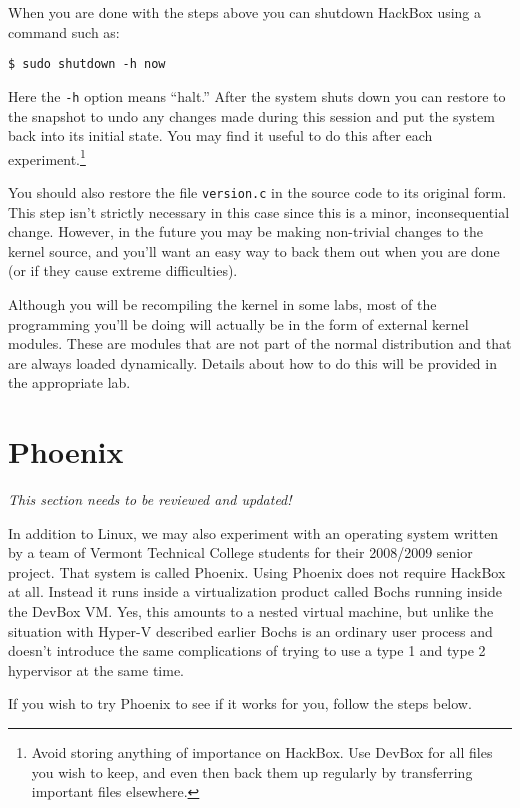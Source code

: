 \documentclass[twocolumn]{article}
\newcommand{\filename}[1]{\texttt{#1}}
\begin{document}
When you are done with the steps above you can shutdown HackBox using a command such as:
\begin{Verbatim}
$ sudo shutdown -h now
\end{Verbatim}
Here the \texttt{-h} option means ``halt.'' After the system shuts down you can restore to the
snapshot to undo any changes made during this session and put the system back into its initial
state. You may find it useful to do this after each experiment.\footnote{Avoid storing anything
  of importance on HackBox. Use DevBox for all files you wish to keep, and even then back them
  up regularly by transferring important files elsewhere.}

You should also restore the file \filename{version.c} in the source code to its original form.
This step isn't strictly necessary in this case since this is a minor, inconsequential change.
However, in the future you may be making non-trivial changes to the kernel source, and you'll
want an easy way to back them out when you are done (or if they cause extreme difficulties).

Although you will be recompiling the kernel in some labs, most of the programming you'll be
doing will actually be in the form of external kernel modules. These are modules that are not
part of the normal distribution and that are always loaded dynamically. Details about how to do
this will be provided in the appropriate lab.

\section{Phoenix}

\textit{This section needs to be reviewed and updated!}

In addition to Linux, we may also experiment with an operating system written by a team of
Vermont Technical College students for their 2008/2009 senior project. That system is called
Phoenix. Using Phoenix does not require HackBox at all. Instead it runs inside a virtualization
product called Bochs running inside the DevBox VM. Yes, this amounts to a nested virtual
machine, but unlike the situation with Hyper-V described earlier Bochs is an ordinary user
process and doesn't introduce the same complications of trying to use a type 1 and type 2
hypervisor at the same time.

If you wish to try Phoenix to see if it works for you, follow the steps below.
\end{document}
